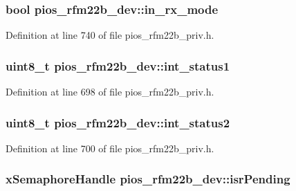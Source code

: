 \hypertarget{structpios__rfm22b__dev_a5d1bb77d70e2da36174e66d08e42cac6}{
\subsubsection[{in\-\_\-rx\-\_\-mode}]{\setlength{\rightskip}{0pt plus 5cm}bool {\bf pios\-\_\-rfm22b\-\_\-dev\-::in\-\_\-rx\-\_\-mode}}}\label{structpios__rfm22b__dev_a5d1bb77d70e2da36174e66d08e42cac6}


\-Definition at line 740 of file pios\-\_\-rfm22b\-\_\-priv.\-h.

\hypertarget{structpios__rfm22b__dev_a9a3b8dfbadc7d813f3f9a2e9a40373f7}{
\subsubsection[{int\-\_\-status1}]{\setlength{\rightskip}{0pt plus 5cm}uint8\-\_\-t {\bf pios\-\_\-rfm22b\-\_\-dev\-::int\-\_\-status1}}}\label{structpios__rfm22b__dev_a9a3b8dfbadc7d813f3f9a2e9a40373f7}


\-Definition at line 698 of file pios\-\_\-rfm22b\-\_\-priv.\-h.

\hypertarget{structpios__rfm22b__dev_a59c62fb8b9b007e94890dc8a9d9c72e3}{
\subsubsection[{int\-\_\-status2}]{\setlength{\rightskip}{0pt plus 5cm}uint8\-\_\-t {\bf pios\-\_\-rfm22b\-\_\-dev\-::int\-\_\-status2}}}\label{structpios__rfm22b__dev_a59c62fb8b9b007e94890dc8a9d9c72e3}


\-Definition at line 700 of file pios\-\_\-rfm22b\-\_\-priv.\-h.

\hypertarget{structpios__rfm22b__dev_a9e681596408e8e6d5387ecdd43acfe62}{
\subsubsection[{isr\-Pending}]{\setlength{\rightskip}{0pt plus 5cm}x\-Semaphore\-Handle {\bf pios\-\_\-rfm22b\-\_\-dev\-::isr\-Pending}}}\label{structpios__rfm22b__dev_a9e681596408e8e6d5387ecdd43acfe62}


